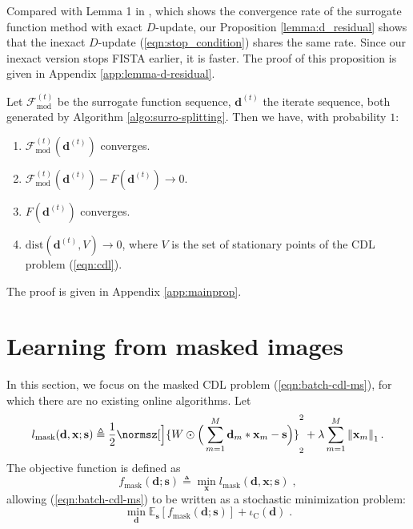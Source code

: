 \documentclass[final]{siamart1116}
\newcommand{\mb}[1]{\mathbf{#1}}
\providecommand{\norm}[1]{\left\lVert#1\right\rVert}
\def \E  {\mathbb{E}}
\def \F  {\mathcal{F}}
\begin{document}
Compared with Lemma 1 in \cite{mairal-2010-online}, which shows the convergence rate of the surrogate function method with exact $D$-update, our Proposition \ref{lemma:d_residual} shows that the inexact $D$-update (\ref{eqn:stop_condition}) shares the same rate. Since our inexact version stops FISTA earlier, it is faster. The proof of this proposition is given in Appendix \ref{app:lemma-d-residual}.

\begin{theorem}
\label{prop:main}
Let $\F^{(t)}_{\mathrm{mod}}$ be the surrogate function sequence, $\mb{d}^{(t)}$ the iterate sequence, both generated by Algorithm \ref{algo:surro-splitting}. Then we have, with probability $1$:
\begin{enumerate}
\item $\F^{(t)}_{\mathrm{mod}}(\mb{d}^{(t)})$ converges.
\item $\F^{(t)}_{\mathrm{mod}}(\mb{d}^{(t)}) - F(\mb{d}^{(t)}) \to 0$. \label{thm:2}
\item $F(\mb{d}^{(t)})$ converges.\label{thm:3}
\item $\mathrm{dist}(\mb{d}^{(t)},V) \to 0$, where $V$ is the set of stationary points of the CDL problem (\ref{eqn:cdl}).\label{thm:4}
\end{enumerate}
\end{theorem}

The proof is given in Appendix \ref{app:mainprop}.


\section{Learning from masked images}
\label{sec:msk}

In this section, we focus on the masked CDL problem (\ref{eqn:batch-cdl-ms}), for which there are no existing online algorithms. Let
\[
l_{\text{mask}}(\mb{d},\mb{x};\mb{s}) \triangleq \frac{1}{2}
    \normsz[\Big]{W \odot \Big(\sum_{m=1}^M \mb{d}_m \ast \mb{x}_{m} - \mb{s}\Big)}_2^2 +
    \lambda  \sum_{m=1}^M \norm{\mb{x}_{m}}_1.
\]
The objective function is defined as
\begin{equation}
\label{eqn:loss-mask}
f_{\text{mask}}(\mb{d}; \mb{s}) \triangleq \min_{\mb{x}} l_{\text{mask}}(\mb{d},\mb{x};\mb{s}) \;,
\end{equation}
allowing (\ref{eqn:batch-cdl-ms}) to be written as a stochastic minimization problem:
\begin{equation}
\label{eqn:mask-cdl}
\min_{\mb{d}} \E_{\mb{s}}[ f_{\text{mask}}(\mb{d}; \mb{s})] + \iota_{\mathrm{C}}(\mb{d}) \;.
\end{equation}
\end{document}
